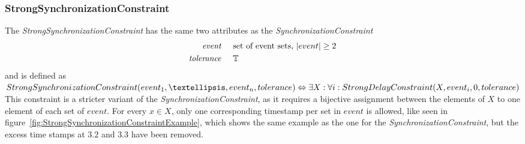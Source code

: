 	\subsubsection{StrongSynchronizationConstraint}
		The \emph{StrongSynchronizationConstraint} has the same two attributes as the \emph{SynchronizationConstraint}
		\begin{align*}
			\emph{event} & \hspace{.5cm}\text{set of event sets, $|event|\geq 2$}\\
			\emph{tolerance} & \hspace{.5cm}\mathbb{T}
		\end{align*}
		and is defined as\\[10pt]
		\begin{math}\\
			StrongSynchronizationConstraint ( event_1, …, event_n, tolerance )\\
			\Leftrightarrow\exists X: \forall i: StrongDelayConstraint(X, event_i, 0, tolerance)
		\end{math}\\[10pt]
		This constraint is a stricter variant of the \emph{SynchronizationConstraint}, as it requires a bijective assignment between the elements of $X$ to one element of each set of $event$. For every $x\in X$, only one corresponding timestamp per set in $event$ is allowed, like seen in figure~\ref{fig:StrongSynchronizationConstraintExample}, which shows the same example as the one for the \emph{SynchronizationConstraint}, but the excess time stamps at $3.2$ and $3.3$ have been removed.
